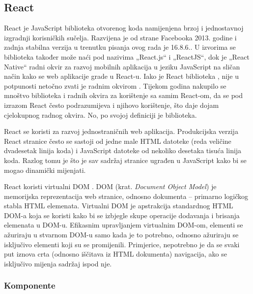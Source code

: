 \documentclass[times, utf8, diplomski, numeric]{fer}
\newcommand{\razmakp}{\vspace{18pt}}
\newcommand{\razmaks}{\vspace{10pt}}
\begin{document}
\razmaks
\subsection{React}

React je JavaScript biblioteka otvorenog koda namijenjena brzoj i jednostavnoj izgradnji korisničkih sučelja.
Razvijena je od strane Facebooka 2013. godine i zadnja stabilna verzija u trenutku pisanja ovog rada je 16.8.6.\citep{gh_react_changelog}.
U izvorima se biblioteka također može naći pod nazivima „React.js“ i „ReactJS“, dok je „React Native“ radni okvir za razvoj mobilnih aplikacija u jeziku JavaScript na sličan način kako se web aplikacije grade u React-u\citep{wiki_react}.
Iako je React biblioteka , nije u potpunosti netočno zvati je radnim okvirom .
Tijekom godina nakupilo se mnoštvo biblioteka i radnih okvira za korištenje sa samim React-om, da se pod izrazom React često podrazumijeva i njihovo korištenje, što daje dojam cjelokupnog radnog okvira. No, po svojoj definiciji je biblioteka.

React se koristi za razvoj jednostraničnih  web aplikacija.
Produkcijska verzija React stranice često se sastoji od jedne male HTML datoteke (reda veličine dvadesetak linija koda) i JavaScript datoteke od nekoliko desetaka tisuća linija koda.
Razlog tomu je što je sav sadržaj stranice ugrađen u JavaScript kako bi se mogao dinamički mijenjati.

\razmakp

React koristi virtualni DOM .
DOM (krat. \emph{Document Object Model}) je memorijska reprezentacija web stranice, odnosno dokumenta – primarno logičkog stabla HTML elemenata\citep{mdn_dom}.
Virtualni DOM je apstrakcija standardnog HTML DOM-a koja se koristi kako bi se izbjegle skupe operacije dodavanja i brisanja elemenata u DOM-u.
Efikasnim upravljanjem virtualnim DOM-om, elementi se ažuriraju u stvarnom DOM-u samo kada je to potrebno, odnosno ažuriraju se isključivo elementi koji su se promijenili\citep{med_vdom}.
Primjerice, nepotrebno je da se svaki put iznova crta (odnosno iščitava iz HTML dokumenta) navigacija, ako se isključivo mijenja sadržaj ispod nje.

\razmakp
\subsubsection{Komponente}
\end{document}

